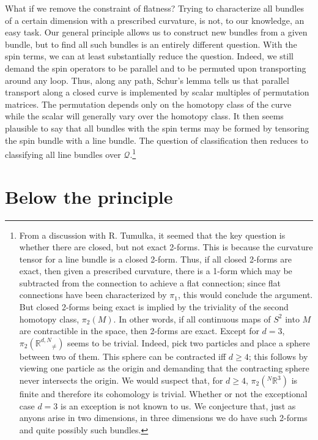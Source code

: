 \documentclass[11pt]{article}
\theoremstyle{remark}
\begin{document}
What if we remove the constraint of flatness? 
Trying to characterize all bundles of a certain dimension with a
prescribed curvature, is not, to our knowledge, 
an easy task. Our general principle allows us to construct new bundles
from a given bundle, but to find all such bundles is an entirely
different question. With the spin terms, we can at least substantially
reduce the question. Indeed, we still demand the spin operators to be
parallel and to be permuted upon transporting around any loop. 
Thus, along any path, Schur's lemma tells us that 
parallel transport along a closed
curve is implemented by scalar multiples of permutation matrices. The
permutation depends only on the homotopy class of the curve while the
scalar will generally vary over the homotopy class. It then seems
plausible to say that all bundles with the spin terms may be formed by
tensoring the spin bundle with a line bundle. The question of
classification then reduces to classifying all line bundles over
\ensuremath{\mathcal{Q}}.\footnote{From a discussion with R. Tumulka, it seemed that
the key question is whether there are closed, but not exact
2-forms. This is because the curvature tensor for a line bundle is
a closed 2-form. Thus, if all closed 2-forms are exact, then given a
prescribed curvature, there is a 1-form which may be subtracted from
the connection to achieve a flat connection; since flat connections
have been characterized by $\pi_1$, this would conclude the argument. 
But closed
2-forms being exact is implied by the triviality of the second
homotopy class, $\pi_2(M)$. 
In other words, if all continuous maps of $S^2$ into
$M$ are 
contractible in the space, then 2-forms are exact. 
Except for $d=3$,  $\pi_2(\ensuremath{\ensuremath{\mathbb{R}^{d,N}}_{\neq}})$ seems to be
trivial. Indeed, pick two particles and place a sphere between two of
them. This sphere can be contracted iff $d \geq 4$; this follows by
viewing one particle as the origin and demanding that the contracting
 sphere never intersects the origin. We would suspect that, for $d
\geq 4$, $\pi_2(\ensuremath{{}^N\ensuremath{\mathbb{R}^{\ensuremath{3}}}})$ is finite and therefore its cohomology is trivial. 
Whether or not the exceptional case $d=3$ is an exception is
not known to us. We conjecture that, just as anyons arise in two
dimensions, in three dimensions we do have such 2-forms and quite
possibly such bundles. 
}


\section{Below the principle} \label{iss:beypri}
\end{document}
